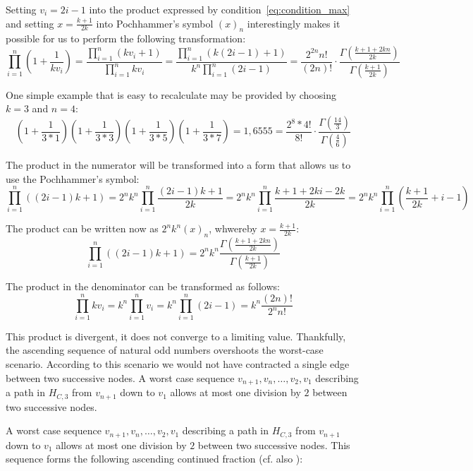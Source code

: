 Setting $v_i=2i-1$ into the product expressed by condition~\ref{eq:condition_max} and setting $x=\frac{k+1}{2k}$ into Pochhammer’s symbol $(x)_n$ interestingly makes it possible for us to perform the following transformation:
\[
\prod_{i=1}^{n}\left(1+\frac{1}{kv_i}\right)
=\frac{\prod_{i=1}^{n}(kv_i+1)}{\prod_{i=1}^{n}kv_i}
=\frac{\prod_{i=1}^{n}\left(k(2i-1)+1\right)}{k^n\prod_{i=1}^{n}(2i-1)}
=\frac{2^{2n}n!}{(2n)!}\cdot\frac{\Gamma\left(\frac{k+1+2kn}{2k}\right)}{\Gamma\left(\frac{k+1}{2k}\right)}
\]

\begin{example}
	One simple example that is easy to recalculate may be provided by choosing $k=3$ and $n=4$:
	\[
	\left(1+\frac{1}{3*1}\right)\left(1+\frac{1}{3*3}\right)\left(1+\frac{1}{3*5}\right)\left(1+\frac{1}{3*7}\right)=1,6555=\frac{2^8*4!}{8!}\cdot\frac{\Gamma(\frac{14}{3})}{\Gamma(\frac{4}{6})}
	\]
\end{example}

The product in the numerator will be transformed into a form that allows us to use the Pochhammer’s symbol:
\[\prod_{i=1}^{n}\left((2i-1)k+1\right)=2^nk^n\prod_{i=1}^{n}\frac{(2i-1)k+1}{2k}=2^nk^n\prod_{i=1}^{n}\frac{k+1+2ki-2k}{2k}=2^nk^n\prod_{i=1}^{n}\left(\frac{k+1}{2k}+i-1\right)\]

The product can be written now as $2^nk^n(x)_n$, whwereby $x=\frac{k+1}{2k}$:
\[\prod_{i=1}^{n}\left((2i-1)k+1\right)=2^nk^n\frac{\Gamma\left(\frac{k+1+2kn}{2k}\right)}{\Gamma\left(\frac{k+1}{2k}\right)}\]

The product in the denominator can be transformed as follows:
\[\prod_{i=1}^{n}kv_i=k^n\prod_{i=1}^{n}v_i=k^n\prod_{i=1}^{n}(2i-1)=k^n\frac{(2n)!}{2^nn!}\]

\par\medskip
This product is divergent, it does not converge to a limiting value. Thankfully, the ascending sequence of natural odd numbers overshoots the worst-case scenario. According to this scenario we would not have contracted a single edge between two successive nodes. A worst case sequence $v_{n+1},v_n,\ldots,v_2,v_1$ describing a path in $H_{C,3}$ from $v_{n+1}$ down to $v_1$ allows at most one division by $2$ between two successive nodes.

\par\medskip
A worst case sequence $v_{n+1},v_n,\ldots,v_2,v_1$ describing a path in $H_{C,3}$ from $v_{n+1}$ down to $v_1$ allows at most one division by $2$ between two successive nodes. This sequence forms the following ascending continued fraction (cf. also \cite[p.~11]{Ref_Laarhoven}):

